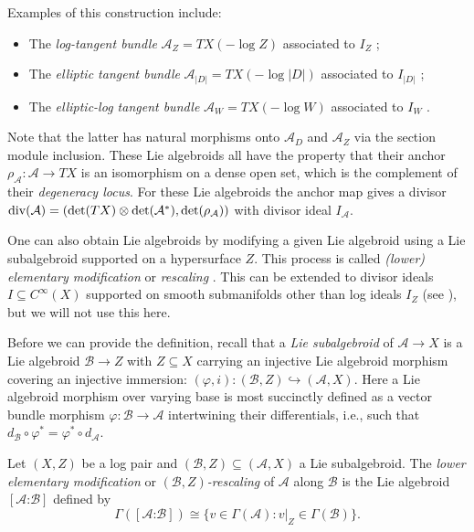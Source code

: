 \documentclass[10pt,a4paper]{amsart}
\numberwithin{equation}{section}
\begin{document}
Examples of this construction include:
\begin{itemize}\itemsep=0pt
\item The \emph{log-tangent bundle} $\mathcal{A}_Z = TX(-\log Z)$ associated to $I_Z$ \cite{Melrose93};
\item The \emph{elliptic tangent bundle} $\mathcal{A}_{|D|} = TX(-\log |D|)$ associated to $I_{|D|}$ \cite{CavalcantiGualtieri18};
\item The \emph{elliptic-log tangent bundle} $\mathcal{A}_W = TX(-\log W)$ associated to $I_W$ \cite{Klaasse18}.	
\end{itemize}
Note that the latter has natural morphisms onto $\mathcal{A}_D$ and $\mathcal{A}_Z$ via the section module inclusion. These Lie algebroids all have the property that their anchor $\rho_\mathcal{A}\colon \mathcal{A} \to TX$ is an isomorphism on a dense open set, which is the complement of their \emph{degeneracy locus}. For these Lie algebroids the anchor map gives a divisor ${\rm div}(\mathcal{A}) = (\det(TX) \otimes \det(\mathcal{A}^*), \det(\rho_\mathcal{A}))$ with divisor ideal $I_\mathcal{A}$.

One can also obtain Lie algebroids by modifying a given Lie algebroid using a Lie subalgebroid supported on a hypersurface $Z$. This process is called \emph{(lower) elementary modification} \cite{GualtieriLi14,Li13} or \emph{rescaling} \cite{Lanius16, Melrose93}. This can be extended to divisor ideals $I \subseteq C^\infty(X)$ supported on smooth submanifolds other than log ideals $I_Z$ (see \cite{Klaasse18}), but we will not use this here.

Before we can provide the definition, recall that a \emph{Lie subalgebroid} of $\mathcal{A} \to X$ is a Lie algebroid $\mathcal{B} \to Z$ with $Z \subseteq X$ carrying an injective Lie algebroid morphism covering an injective immersion: $(\varphi,i)\colon (\mathcal{B},Z) \hookrightarrow (\mathcal{A},X)$. Here a Lie algebroid morphism over varying base is most succinctly defined as a vector bundle morphism $\varphi\colon \mathcal{B} \to \mathcal{A}$ intertwining their differentials, i.e., such that $d_\mathcal{B} \circ \varphi^* = \varphi^* \circ d_\mathcal{A}$.

\begin{Definition} Let $(X,Z)$ be a log pair and $(\mathcal{B},Z) \subseteq (\mathcal{A},X)$ a Lie subalgebroid. The \emph{lower elementary modification} or \emph{$(\mathcal{B},Z)$-rescaling} of $\mathcal{A}$ along $\mathcal{B}$ is the Lie algebroid $[\mathcal{A}\text{:}\mathcal{B}]$ defined by
	\begin{displaymath}
	\Gamma([\mathcal{A}\text{:}\mathcal{B}]) \cong \{v \in \Gamma(\mathcal{A}) \colon v|_Z \in \Gamma(\mathcal{B})\}.
	\end{displaymath}
\end{Definition}
\end{document}
